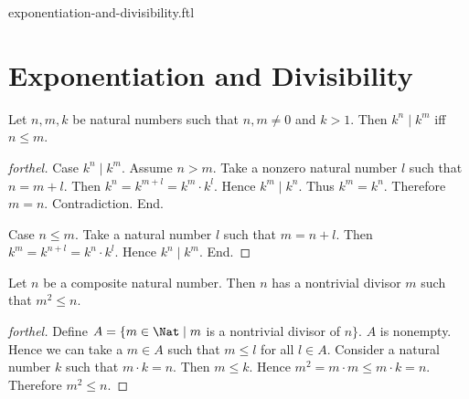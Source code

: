 \documentclass{naproche-library}
\begin{document}
\begin{smodule}{exponentiation-and-divisibility.ftl}

  \section*{Exponentiation and Divisibility}

  \begin{proposition}[forthel,id=ARITHMETIC_13_8426075493236736]
    Let $n, m, k$ be natural numbers such that $n, m \neq 0$ and $k > 1$.
    Then $k^{n} \mid k^{m}$ iff $n \leq m$.
  \end{proposition}
  \begin{proof}[forthel]
    Case $k^{n} \mid k^{m}$.
      Assume $n > m$.
      Take a nonzero natural number $l$ such that $n = m + l$.
      Then $k^{n}
        = k^{m + l}
        = k^{m} \cdot k^{l}$.
      Hence $k^{m} \mid k^{n}$.
      Thus $k^{m} = k^{n}$.
      Therefore $m = n$.
      Contradiction.
    End.

    Case $n \leq m$.
      Take a natural number $l$ such that $m = n + l$.
      Then $k^{m}
        = k^{n + l}
        = k^{n} \cdot k^{l}$.
      Hence $k^{n} \mid k^{m}$.
    End.
  \end{proof}

  \begin{proposition}[forthel,id=ARITHMETIC_13_797196163219456]
    Let $n$ be a composite natural number.
    Then $n$ has a nontrivial divisor $m$ such that $m^{2} \leq n$.
  \end{proposition}
  \begin{proof}[forthel]
    Define $A = \{ m \in \Nat \mid m$ is a nontrivial divisor of $n \}$.
    $A$ is nonempty.
    Hence we can take a $m \in A$ such that $m \leq l$ for all $l \in A$.
    Consider a natural number $k$ such that $m \cdot k = n$.
    Then $m \leq k$.
    Hence $m^{2} = m \cdot m \leq m \cdot k = n$.
    Therefore $m^{2} \leq n$.
  \end{proof}
\end{smodule}
\end{document}
